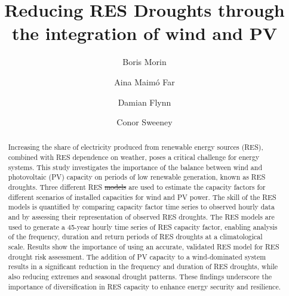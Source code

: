 \documentclass[preprint, 12pt]{elsarticle}
\providecommand{\DIFadd}[1]{{\protect\color{blue}\uwave{#1}}} %
\providecommand{\DIFdel}[1]{{\protect\color{red}\sout{#1}}}                      %
\providecommand{\DIFaddbegin}{} %
\providecommand{\DIFaddend}{} %
\providecommand{\DIFdelbegin}{} %
\providecommand{\DIFdelend}{} %
\begin{document}
\begin{frontmatter}


\title{Reducing RES Droughts through the integration of wind and \DIFaddbegin \DIFadd{Solar }\DIFaddend PV}

\author[Math]{Boris Morin }

\author[Math]{Aina Maimó Far}

\author[Eng]{Damian Flynn}

\author[Math]{Conor Sweeney}




\begin{abstract}
Increasing the share of electricity produced from renewable energy sources (RES), combined with RES dependence on weather, poses a critical challenge for energy systems. This study investigates the importance of the balance between wind and \DIFaddbegin \DIFadd{solar }\DIFaddend photovoltaic (PV) capacity on periods of low renewable generation, known as RES droughts. Three different RES \DIFdelbegin \DIFdel{models }\DIFdelend \DIFaddbegin \DIFadd{datasets }\DIFaddend are used to estimate the capacity factors for different scenarios of installed capacities for wind and \DIFaddbegin \DIFadd{solar }\DIFaddend PV power. The skill of the RES models is quantified by comparing capacity factor time series to observed hourly data and by assessing their representation of observed RES droughts. The RES models are used to generate a 45-year hourly time series of RES capacity factor, enabling analysis of the frequency, duration and return periods of RES droughts at a climatological scale. Results show the importance of using an accurate, validated RES model for RES drought risk assessment. The addition of \DIFaddbegin \DIFadd{solar }\DIFaddend PV capacity to a wind-dominated system results in a significant reduction in the frequency and duration of RES droughts, while also reducing extremes and seasonal drought patterns. These findings underscore the importance of diversification in RES capacity to enhance energy security and resilience.
\end{abstract}


\end{frontmatter}
\end{document}
